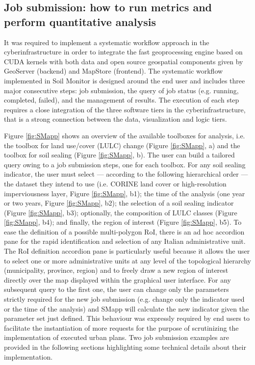 \documentclass[APA,LATO1COL,doublespace]{WileyNJD-v2}
\begin{document}
\subsection{Job submission: how to run metrics and perform quantitative analysis}
\label{sec:jobsubmission}
It was required to implement a systematic workflow approach in the cyberinfrastructure in order to integrate the fast geoprocessing engine based on CUDA kernels with both data and open source geospatial components given by GeoServer (backend) and MapStore (frontend). 
The systematic workflow implemented in Soil Monitor is designed around the end user and includes three major consecutive steps: job submission, the query of job status (e.g. running, completed, failed), and the management of results.
The execution of each step requires a close integration of the three software tiers in the cyberinfrastructure, that is a strong connection between the data, visualization and logic tiers. 

Figure \ref{fig:SMapp} shows an overview of the available toolboxes for analysis, i.e. the toolbox for land use/cover (LULC) change (Figure \ref{fig:SMapp}, a) and the toolbox for soil sealing (Figure \ref{fig:SMapp}, b).
The user can build a tailored query owing to a job submission steps, one for each toolbox. 
For any soil sealing indicator, the user must select --- according to the following hierarchical order --- 
the dataset they intend to use (i.e. CORINE land cover or high-resolution imperviousness layer, Figure \ref{fig:SMapp}, b1); 
the time of the analysis (one year or two years, Figure \ref{fig:SMapp}, b2); 
the selection of a soil sealing indicator (Figure \ref{fig:SMapp}, b3); 
optionally, the composition of LULC classes (Figure \ref{fig:SMapp}, b4); 
and finally, the region of interest (Figure \ref{fig:SMapp}, b5). 
To ease the definition of a possible multi-polygon RoI, there is an ad hoc accordion pane for the rapid identification and selection of any Italian administrative unit.
The RoI definition accordion pane is particularly useful because it allows the user to select one or more administrative units at any level of the topological hierarchy (municipality, province, region) and to freely draw a new region of interest directly over the map displayed within the graphical user interface.
For any subsequent query to the first one, the user can change only the parameters strictly required for the new job submission (e.g. change only the indicator used or the time of the analysis) and SMapp will calculate the new indicator given the parameter set just defined. 
This behaviour was expressly required by end users to facilitate the instantiation of more requests for the purpose of scrutinizing the implementation of executed urban plans.
Two job submission examples are provided in the following sections highlighting some technical details about their implementation.
\end{document}
